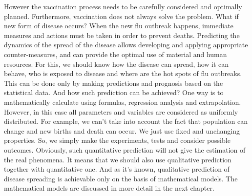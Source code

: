 However the vaccination process needs to be carefully considered and optimally planned. Furthermore, vaccination does not always solve the problem. What if new form of disease occurs? When the new flu outbreak happens, immediate measures and actions must be taken in order to prevent deaths. Predicting the dynamics of the spread of the disease allows developing and applying appropriate counter-measures, and can provide the optimal use of material and human resources.  For this, we should know how the disease can spread, how it can behave, who is exposed to disease and where are the hot spots of flu outbreaks. This can be done only by making predictions and prognosis based on the statistical data. And how such prediction can be achieved? One way is to mathematically calculate using formulas, regression analysis and extrapolation. However, in this case all parameters and variables are considered as uniformly distributed. For example, we can’t take into account the fact that population can change and new births and death can occur. We just use fixed and unchanging properties. So, we simply make the experiments, tests and consider possible outcomes. Obviously, such quantitative prediction will not give the estimation of the real phenomena. It means that we should also use qualitative prediction together with quantitative one. And as it’s known, qualitative prediction of disease spreading is achievable only on the basis of mathematical models. The mathematical models are discussed in more detail in the next chapter.